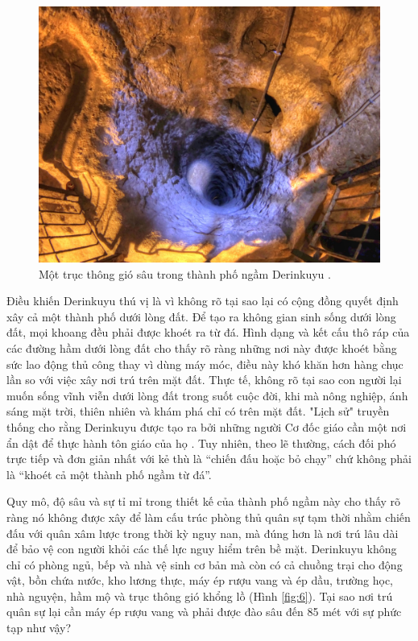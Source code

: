 \documentclass[10pt,twocolumn,letterpaper]{article}
\begin{document}
\begin{figure}[t]
\begin{center}
   \includegraphics[width=1\linewidth]{derinkuyu-air.jpg}
\end{center}
   \caption{Một trục thông gió sâu trong thành phố ngầm Derinkuyu \cite{53}.}
\label{fig:6}
\label{fig:onecol}
\end{figure}

Điều khiến Derinkuyu thú vị là vì không rõ tại sao lại có cộng đồng quyết định xây cả một thành phố dưới lòng đất. Để tạo ra không gian sinh sống dưới lòng đất, mọi khoang đều phải được khoét ra từ đá. Hình dạng và kết cấu thô ráp của các đường hầm dưới lòng đất cho thấy rõ ràng những nơi này được khoét bằng sức lao động thủ công thay vì dùng máy móc, điều này khó khăn hơn hàng chục lần so với việc xây nơi trú trên mặt đất. Thực tế, không rõ tại sao con người lại muốn sống vĩnh viễn dưới lòng đất trong suốt cuộc đời, khi mà nông nghiệp, ánh sáng mặt trời, thiên nhiên và khám phá chỉ có trên mặt đất. "Lịch sử" truyền thống cho rằng Derinkuyu được tạo ra bởi những người Cơ đốc giáo cần một nơi ẩn dật để thực hành tôn giáo của họ \cite{53}. Tuy nhiên, theo lẽ thường, cách đối phó trực tiếp và đơn giản nhất với kẻ thù là “chiến đấu hoặc bỏ chạy” chứ không phải là “khoét cả một thành phố ngầm từ đá”.

Quy mô, độ sâu và sự tỉ mỉ trong thiết kế của thành phố ngầm này cho thấy rõ ràng nó không được xây để làm cấu trúc phòng thủ quân sự tạm thời nhằm chiến đấu với quân xâm lược trong thời kỳ nguy nan, mà đúng hơn là nơi trú lâu dài để bảo vệ con người khỏi các thế lực nguy hiểm trên bề mặt. Derinkuyu không chỉ có phòng ngủ, bếp và nhà vệ sinh cơ bản mà còn có cả chuồng trại cho động vật, bồn chứa nước, kho lương thực, máy ép rượu vang và ép dầu, trường học, nhà nguyện, hầm mộ và trục thông gió khổng lồ (Hình \ref{fig:6}). Tại sao nơi trú quân sự lại cần máy ép rượu vang và phải được đào sâu đến 85 mét với sự phức tạp như vậy?
\end{document}
